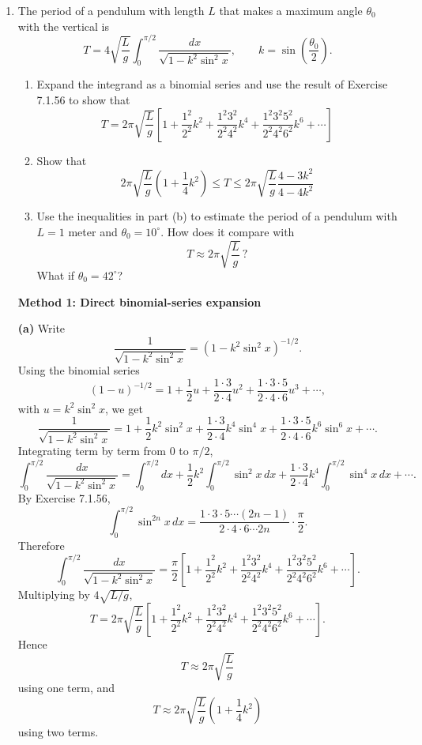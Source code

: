 \documentclass[a4paper,12pt,twocolumn]{article}
\newenvironment{solutionbox}{\begin{framed}}{\end{framed}}
\begin{document}
\begin{enumerate}[label=\textbf{\arabic*.}, leftmargin=2em, itemsep=1.2em]
\begin{solutionbox}
\medskip
\textbf{Answer:}
\[
\boxed{\pi = 2\sqrt{3}\sum_{n=0}^{\infty}\frac{(-1)^n}{(2n+1)3^n}.}
\]
\end{solutionbox}

\setcounter{enumi}{37}
\item The period of a pendulum with length \(L\) that makes a maximum angle \(\theta_0\) with the vertical is
\[
T = 4\sqrt{\frac{L}{g}} \int_0^{\pi/2} \frac{dx}{\sqrt{1-k^2\sin^2 x}},
\qquad
k=\sin\left(\frac{\theta_0}{2}\right).
\]
\begin{enumerate}[label=(\alph*), leftmargin=2em]
\item Expand the integrand as a binomial series and use the result of Exercise 7.1.56 to show that
\[
T = 2\pi\sqrt{\frac{L}{g}}
\left[
1+\frac{1^2}{2^2}k^2+\frac{1^2 3^2}{2^2 4^2}k^4+\frac{1^2 3^2 5^2}{2^2 4^2 6^2}k^6+\cdots
\right]
\]
\item Show that
\[
2\pi\sqrt{\frac{L}{g}}\left(1+\frac{1}{4}k^2\right)
\leq
T
\leq
2\pi\sqrt{\frac{L}{g}}\frac{4-3k^2}{4-4k^2}
\]
\item Use the inequalities in part (b) to estimate the period of a pendulum with \(L=1\) meter and \(\theta_0=10^\circ\). How does it compare with
\[
T \approx 2\pi\sqrt{\frac{L}{g}}\,?
\]
What if \(\theta_0=42^\circ\)?
\end{enumerate}

\begin{solutionbox}
\textbf{Method 1: Direct binomial-series expansion}

\textbf{(a)} Write
\[
\frac{1}{\sqrt{1-k^2\sin^2 x}}=(1-k^2\sin^2 x)^{-1/2}.
\]
Using the binomial series
\[
(1-u)^{-1/2}
=
1+\frac12u+\frac{1\cdot 3}{2\cdot 4}u^2+\frac{1\cdot 3\cdot 5}{2\cdot 4\cdot 6}u^3+\cdots,
\]
with \(u=k^2\sin^2 x\), we get
\[
\frac{1}{\sqrt{1-k^2\sin^2 x}}
=
1+\frac12k^2\sin^2x+\frac{1\cdot 3}{2\cdot 4}k^4\sin^4x+\frac{1\cdot 3\cdot 5}{2\cdot 4\cdot 6}k^6\sin^6x+\cdots.
\]
Integrating term by term from \(0\) to \(\pi/2\),
\[
\int_0^{\pi/2}\frac{dx}{\sqrt{1-k^2\sin^2x}}
=
\int_0^{\pi/2}dx
+\frac12k^2\int_0^{\pi/2}\sin^2x\,dx
+\frac{1\cdot 3}{2\cdot 4}k^4\int_0^{\pi/2}\sin^4x\,dx+\cdots.
\]
By Exercise 7.1.56,
\[
\int_0^{\pi/2}\sin^{2n}x\,dx
=
\frac{1\cdot 3\cdot 5\cdots(2n-1)}{2\cdot 4\cdot 6\cdots 2n}\cdot\frac{\pi}{2}.
\]
Therefore
\[
\int_0^{\pi/2}\frac{dx}{\sqrt{1-k^2\sin^2x}}
=
\frac{\pi}{2}
\left[
1+\frac{1^2}{2^2}k^2+\frac{1^2 3^2}{2^2 4^2}k^4+\frac{1^2 3^2 5^2}{2^2 4^2 6^2}k^6+\cdots
\right].
\]
Multiplying by \(4\sqrt{L/g}\),
\[
\boxed{
T=
2\pi\sqrt{\frac{L}{g}}
\left[
1+\frac{1^2}{2^2}k^2+\frac{1^2 3^2}{2^2 4^2}k^4+\frac{1^2 3^2 5^2}{2^2 4^2 6^2}k^6+\cdots
\right].
}
\]
Hence
\[
T\approx 2\pi\sqrt{\frac{L}{g}}
\]
using one term, and
\[
T\approx 2\pi\sqrt{\frac{L}{g}}\left(1+\frac14k^2\right)
\]
using two terms.


\end{solutionbox}
\end{enumerate}
\end{document}
